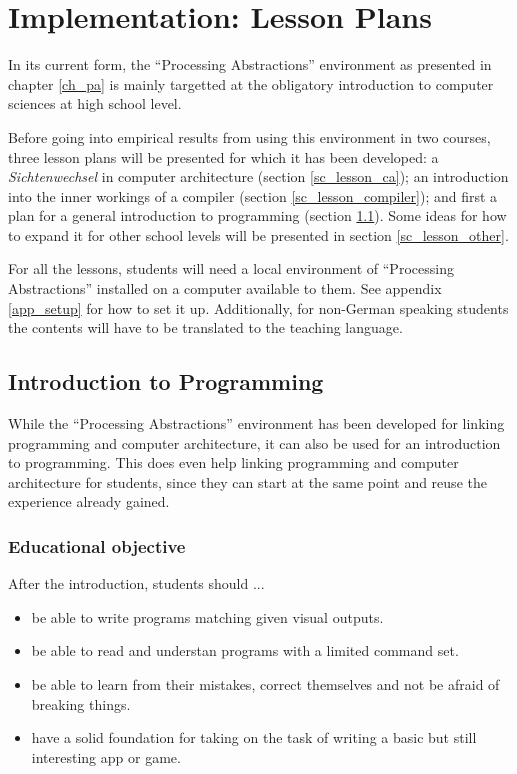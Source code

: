 
\chapter{Implementation: Lesson Plans} \label{ch_teaching}

In its current form, the ``Processing Abstractions'' environment as presented in chapter \ref{ch_pa} is mainly targetted at the obligatory introduction to computer sciences at high school level.

Before going into empirical results from using this environment in two courses, three lesson plans will be presented for which it has been developed: a \emph{Sichtenwechsel} in computer architecture (section \ref{sc_lesson_ca}); an introduction into the inner workings of a compiler (section \ref{sc_lesson_compiler}); and first a plan for a general introduction to programming (section \ref{sc_lesson_intro}). Some ideas for how to expand it for other school levels will be presented in section \ref{sc_lesson_other}.

For all the lessons, students will need a local environment of ``Processing Abstractions'' installed on a computer available to them. See appendix \ref{app_setup} for how to set it up. Additionally, for non-German speaking students the contents will have to be translated to the teaching language.



\section{Introduction to Programming} \label{sc_lesson_intro}

While the ``Processing Abstractions'' environment has been developed for linking programming and computer architecture, it can also be used for an introduction to programming. This does even help linking programming and computer architecture for students, since they can start at the same point and reuse the experience already gained.


\subsection{Educational objective}

After the introduction, students should ...
\begin{itemize}
\item be able to write programs matching given visual outputs.
\item be able to read and understan programs with a limited command set.
\item be able to learn from their mistakes, correct themselves and not be afraid of breaking things.
\item have a solid foundation for taking on the task of writing a basic but still interesting app or game.
\end{itemize}


